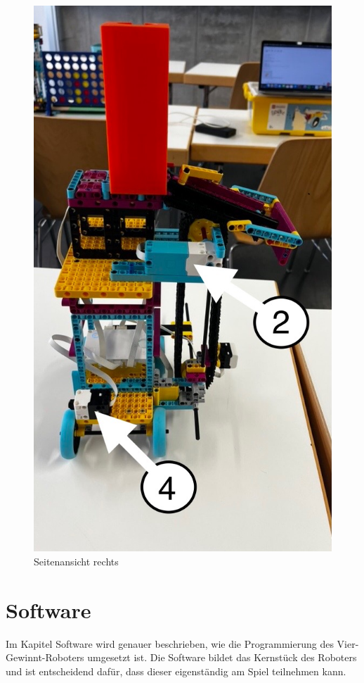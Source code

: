 \begin{figure}[H]
\begin{minipage}[b]{0.48\linewidth}
		\centering
		\includegraphics[width=\linewidth]{images/DAE26A50-277E-4C6B-96A3-F2DE2CC9C004_1_105_c}
		\caption{Seitenansicht rechts}
		\label{fig:seitenansicht-rechts}
	\end{minipage}
\end{figure}


\section{Software}
Im Kapitel Software wird genauer beschrieben, wie die Programmierung des Vier-Gewinnt-Roboters umgesetzt ist. Die Software bildet das Kernstück des Roboters und ist entscheidend dafür, dass dieser eigenständig am Spiel teilnehmen kann.



